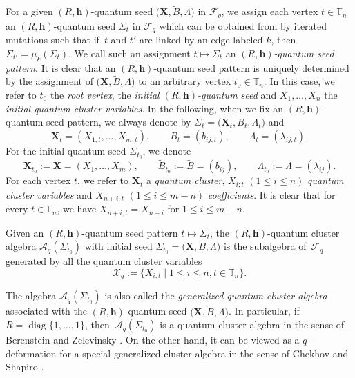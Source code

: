 \documentclass[10pt,a4paper]{amsart}
\numberwithin{equation}{section}
\begin{document}
 For a given $(R,\mathbf{h})$-quantum seed $\bigl(\mathbf{X}, \tilde{B}, \Lambda\bigr)$ in $\mathcal{F}_q$, we assign each vertex $t\in \mathbb{T}_n$ an $(R,\mathbf{h})$-quantum seed $\Sigma_t$ in $\mathcal{F}_q$ which can be obtained from  by iterated mutations such that if~$t$ and $t'$ are linked by an edge labeled $k$, then $\Sigma_{t'}=\mu_k(\Sigma_t)$. We call such an assignment $t\mapsto \Sigma_t$ an {\it $(R,\mathbf{h})$-quantum seed pattern}. It is clear that an $(R,\mathbf{h})$-quantum seed pattern is uniquely determined by the assignment of $\bigl(\mathbf{X},\tilde{B}, \Lambda\bigr)$ to an arbitrary vertex $t_0\in \mathbb{T}_n$. In this case, we refer to $t_0$ the {\it root vertex},  the {\it initial $(R,\mathbf{h})$-quantum seed} and $X_1,\dots,X_n$ the {\it initial quantum cluster variables}.
 In the following, when we fix an $(R,\mathbf{h})$-quantum seed pattern, we always denote by $\Sigma_t=\bigl(\mathbf{X}_t,\tilde{B}_t,\Lambda_t\bigr)$ and
\[\mathbf{X}_t=(X_{1;t},\dots,X_{m;t}),\qquad \tilde{B}_t=(b_{ij;t}),\qquad \Lambda_t=(\lambda_{ij;t}).
\]
For the initial quantum seed $\Sigma_{t_0}$, we denote
\[
\mathbf{X}_{t_0}:=\mathbf{X}=(X_1,\dots, X_{m}),\qquad \tilde{B}_{t_0}:=\tilde{B}=(b_{ij}), \qquad\Lambda_{t_0}:=\Lambda=(\lambda_{ij}).
\]
For each vertex $t$, we refer to $\mathbf{X}_t$ a {\it quantum cluster}, $X_{i;t}$ $(1\leq i\leq n)$ {\it quantum cluster variables} and $X_{n+i;t}$ $(1\leq i\leq m-n)$ {\it coefficients}.
It is clear that for every $t\in \mathbb{T}_n$, we have $X_{n+i;t}=X_{n+i}$ for $1\leq i\leq m-n$.
\begin{Definition}
 Given an $(R,\mathbf{h})$-quantum seed pattern $t\mapsto \Sigma_t$, the $(R,\mathbf{h})$-quantum cluster algebra $\mathcal{A}_q(\Sigma_{t_0})$ with initial seed $\Sigma_{t_0}=\bigl(\mathbf{X},\tilde{B},\Lambda\bigr)$ is the  subalgebra of~$\mathcal{F}_q$ generated by all the quantum cluster variables
 \[\mathcal{X}_q:=\{X_{i;t}\mid 1\le i\le n, t\in \mathbb{T}_n\}.\]
\end{Definition}
\begin{Remark}
The algebra $\mathcal{A}_q(\Sigma_{t_0})$ is also called the {\it generalized quantum cluster algebra} associated with the $(R,\mathbf{h})$-quantum seed $\bigl(\mathbf{X},\tilde{B},\Lambda\bigr)$. In particular, if $R=\operatorname{diag}\{1,\dots, 1\}$, then~$\mathcal{A}_q(\Sigma_{t_0})$ is a quantum cluster algebra in the sense of Berenstein and Zelevinsky \cite{Berenstein_Zelevinsky2005}. On the other hand, it can be viewed as a $q$-deformation for a special generalized cluster algebra in the sense of Chekhov and Shapiro \cite{Chekhov_Shapiro}.
\end{Remark}
\end{document}
